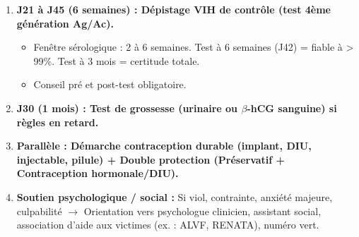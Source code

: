 \documentclass[11pt]{article}
\begin{document}
\begin{methode}[Conduite à tenir après un rapport sexuel non protégé ou à risque (J0 = jour du rapport)]
\begin{enumerate}
    \item \textbf{J21 à J45 (6 semaines) : Dépistage VIH de contrôle (test 4ème génération Ag/Ac).}
    \begin{itemize}
        \item Fenêtre sérologique : 2 à 6 semaines. Test à 6 semaines (J42) = fiable à > 99\%. Test à 3 mois = certitude totale.
        \item Conseil pré et post-test obligatoire.
    \end{itemize}
    \item \textbf{J30 (1 mois) : Test de grossesse (urinaire ou $\beta$-hCG sanguine) si règles en retard.}
    \item \textbf{Parallèle : Démarche contraception durable (implant, DIU, injectable, pilule) + Double protection (Préservatif + Contraception hormonale/DIU).}
    \item \textbf{Soutien psychologique / social :} Si viol, contrainte, anxiété majeure, culpabilité $\rightarrow$ Orientation vers psychologue clinicien, assistant social, association d'aide aux victimes (ex. : ALVF, RENATA), numéro vert.
\end{enumerate}
\end{methode}
\end{document}
